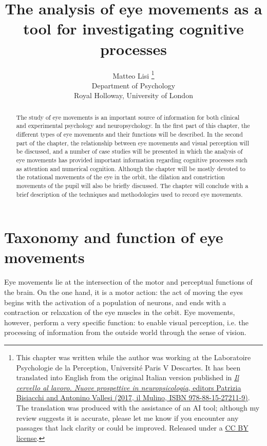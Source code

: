 \documentclass[11pt]{article}
\title{The analysis of eye movements as a tool for investigating cognitive processes}
\author{
        Matteo Lisi \footnote{\scriptsize{This chapter was written while the author was working at the Laboratoire Psychologie de la Perception, Université Paris V Descartes. It has been translated into English from the original Italian version published in \href{https://www.mulino.it/isbn/9788815272119}{\textit{Il cervello al lavoro. Nuove prospettive in neuropsicologia}, editors Patrizia Bisiacchi and Antonino Vallesi (2017, il Mulino, ISBN 978-88-15-27211-9)}. The translation was produced with the assistance of an AI tool; although my review suggests it is accurate, please let me know if you encounter any passages that lack clarity or could be improved. Released under a \href{https://creativecommons.org/licenses/by/2.0/}{CC BY license}.}} \\
        \small{Department of Psychology}\\
        \small{Royal Holloway, University of London}
}
\date{}
\begin{document}
\sloppy
\maketitle

\begin{abstract}
The study of eye movements is an important source of information for both clinical and experimental psychology and neuropsychology. In the first part of this chapter, the different types of eye movements and their functions will be described. In the second part of the chapter, the relationship between eye movements and visual perception will be discussed, and a number of case studies will be presented in which the analysis of eye movements has provided important information regarding cognitive processes such as attention and numerical cognition. Although the chapter will be mostly devoted to the rotational movements of the eye in the orbit, the dilation and constriction movements of the pupil will also be briefly discussed. The chapter will conclude with a brief description of the techniques and methodologies used to record eye movements.
\end{abstract}

\section{Taxonomy and function of eye movements}
Eye movements lie at the intersection of the motor and perceptual functions of the brain. On the one hand, it is a motor action: the act of moving the eyes begins with the activation of a population of neurons, and ends with a contraction or relaxation of the eye muscles in the orbit. Eye movements, however, perform a very specific function: to enable visual perception, i.e. the processing of information from the outside world through the sense of vision.
\end{document}
